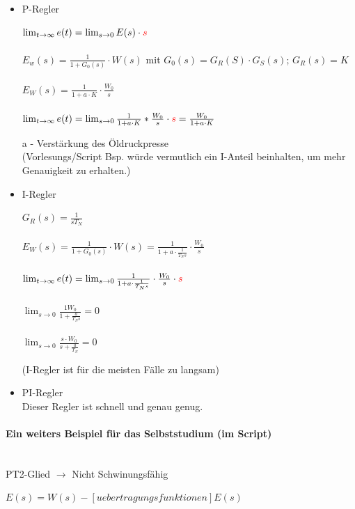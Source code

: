 \documentclass[a4paper, twoside, 11pt]{article}
\begin{document}
\begin{itemize}
	\item P-Regler
	\begin{center}
	$\lim_{t \to \infty} e(t) = \lim_{s \to 0} E(s) \cdot \textcolor{red}{s}$ \\ \mbox{} \\
	$E_w(s) = \frac{1}{1+G_0(s)} \cdot W(s)$ mit $G_0(s) = G_R(S) \cdot G_S(s)$; $G_R(s) = K$ \\ \mbox{} \\
	$E_W(s) = \frac{1}{1+a \cdot K} \cdot \frac{W_0}{s}$ \\ \mbox{} \\
	$\lim_{t \to \infty} e(t) = \lim_{s \to 0} \frac{1}{1+a \cdot K} * \frac{W_0}{s} \cdot \textcolor{red}{s} = \frac{W_0}{1+a \cdot K}$
	\end{center}
	a - Verstärkung des Öldruckpresse\\
	(Vorlesungs/Script Bsp. würde vermutlich ein I-Anteil beinhalten, um mehr Genauigkeit zu erhalten.)

	\item I-Regler
	\begin{center}
	$G_R(s) = \frac{1}{sT_N}$ \\ \mbox{} \\
	$E_W(s) = \frac{1}{1+G_0(s)} \cdot W(s) = \frac{1}{1+a \cdot \frac{1}{T_Ns}} \cdot \frac{W_0}{s}$ \\ \mbox{} \\
	$\lim_{t \to \infty} e(t) = \lim_{s \to 0} \frac{1}{1+a \cdot \frac{1}{T_Ns}} \cdot \frac{W_0}{s} \cdot \textcolor{red}{s}$ \\ \mbox{} \\
	$\lim_{s \to 0} \frac{1 W_0}{1 + \frac{a}{T_Ns}} = 0$ \\ \mbox{} \\
	$\lim_{s \to 0} \frac{s \cdot W_0}{s + \frac{a}{T_N}} = 0$
	\end{center}
	(I-Regler ist für die meisten Fälle zu langsam)
	
	\item PI-Regler \\
	Dieser Regler ist schnell und genau genug.
\end{itemize}

\paragraph{Ein weiters Beispiel für das Selbststudium (im Script)} \mbox{} \\
PT2-Glied $\to$ Nicht Schwinungsfähig
\begin{center}
	$E(s) = W(s) - [uebertragungsfunktionen] E(s)$
\end{center}
\end{document}
